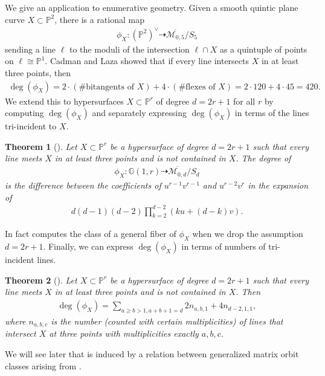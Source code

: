 \documentclass[12pt]{amsart}
\newcommand{\mb}{\mathbb}
\newcommand{\mc}{\mathcal}
\newcommand{\ol}{\overline}
\theoremstyle{plain}
\newtheorem{Thm*}{Theorem}
\theoremstyle{definition}
\theoremstyle{remark}
\begin{document}
We give an application to enumerative geometry. Given a smooth quintic plane curve $X\subset\mb{P}^2$, there is a rational map
\begin{align*}
\phi_X: (\mb{P}^{2})^\vee \dashrightarrow \ol{\mc{M}_{0,5}}/S_5
\end{align*}
sending a line $\ell$ to the moduli of the intersection $\ell \cap X$ as a quintuple of points on $\ell\cong \mb{P}^1$. Cadman and Laza \cite{Laza} showed that if every line intersects $X$ in at least three points, then 
\begin{align*}
\deg (\phi_X) = 2\cdot (\text{\# bitangents of $X$})+4\cdot (\text{\# flexes of $X$}) = 2\cdot 120 + 4\cdot 45 = 420.
\end{align*}
We extend this to hypersurfaces $X\subset\mb{P}^r$ of degree $d=2r+1$ for all $r$ by computing $\deg(\phi_X)$ and separately expressing $\deg(\phi_X)$ in terms of the lines tri-incident to $X$. 

\begin{Thm*}[]
\label{APIntro}
Let $X\subset\mb{P}^r$ be a hypersurface of degree $d=2r+1$ such that every line meets $X$ in at least three points and is not contained in $X$. The degree of
\begin{align*}
\phi_X: \mb{G}(1,r) \dashrightarrow \ol{\mc{M}_{0,d}}/S_{d}
\end{align*}
is the difference between the coefficients of $u^{r-1}v^{r-1}$ and $u^{r-2}v^{r}$ in the expansion of 
\begin{align*}
d(d-1)(d-2)\prod_{k=2}^{d-2} (ku+(d-k)v).
\end{align*}
\end{Thm*}
In fact  computes the class of a general fiber of $\phi_X$ when we drop the assumption $d=2r+1$. Finally, we can express $\deg(\phi_X)$ in terms of numbers of tri-incident lines. 
\begin{Thm*} []
\label{APDIntro}
Let $X\subset\mb{P}^r$ be a hypersurface of degree $d=2r+1$ such that every line meets $X$ in at least three points and is not contained in $X$. Then 
\begin{align}
 \deg(\phi_X) = \sum_{a\ge b>1,a+b+1=d}{2n_{a,b,1}}+4n_{d-2,1,1},\nonumber\label{APT}
\end{align}
where $n_{a,b,c}$ is the number (counted with certain multiplicities) of lines that intersect $X$ at three points with multiplicities exactly $a,b,c$. 
\end{Thm*}
We will see later that  is induced by a relation between generalized matrix orbit classes arising from .
\end{document}

